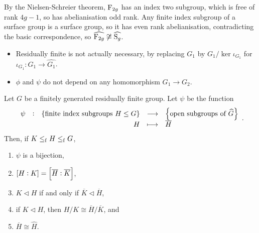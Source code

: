 By the Nielsen-Schreier theorem, $ \mathrm{F}_{2g} $ has an index two subgroup, which is free of rank $ 4g - 1 $, so has abelianisation odd rank. Any finite index subgroup of a surface group is a surface group, so it has even rank abelianisation, contradicting the basic correspondence, so $ \widehat{\mathrm{F}_{2g}} \not\cong \widehat{\mathrm{S}_g} $.


\begin{remark}
\hfill
\begin{itemize}
\item Residually finite is not actually necessary, by replacing $ G_1 $ by $ G_1 / \ker \iota_{G_1} $ for $ \iota_{G_1} : G_1 \to \widehat{G_1} $.
\item $ \phi $ and $ \psi $ do not depend on any homomorphism $ G_1 \to G_2 $.
\end{itemize}
\end{remark}

\begin{proposition}
Let $ G $ be a finitely generated residually finite group. Let $ \psi $ be the function
$$ \function[\psi]{\cbr{\text{finite index subgroups} \ H \le G}}{\cbr{\text{open subgroups of} \ \widehat{G}}}{H}{\overline{H}}. $$
Then, if $ K \le_{\mathrm{f}} H \le_{\mathrm{f}} G $,
\begin{enumerate}
\item $ \psi $ is a bijection,
\item $ \sbr{H : K} = \sbr{\overline{H} : \overline{K}} $,
\item $ K \triangleleft H $ if and only if $ \overline{K} \triangleleft \overline{H} $,
\item if $ K \triangleleft H $, then $ H / K \cong \overline{H} / \overline{K} $, and
\item $ \overline{H} \cong \widehat{H} $.
\end{enumerate}
\end{proposition}

